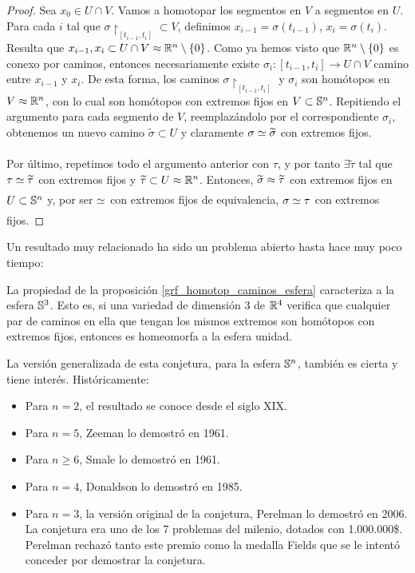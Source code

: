 \begin{prop}
\begin{proof}
		Sea $x_0\in U\cap V$. Vamos a homotopar los segmentos en $V$ a segmentos en $U$. Para cada $i$ tal que $\sigma\restriction_{[t_{i-1},t_i]}\subset V$, definimos $x_{i-1} = \sigma(t_{i-1})$, $x_i=\sigma(t_i)$. Resulta que $x_{i-1},x_i\subset U\cap V\approx \mathbb{R}^n\setminus\{0\}$. Como ya hemos visto que $\mathbb{R}^n\setminus \{0\}$ es conexo por caminos, entonces necesariamente existe $\sigma_i:[t_{i-1},t_i]\to U\cap V$ camino entre $x_{i-1}$ y $x_i$. De esta forma, los caminos $\sigma\restriction_{[t_{i-1},t_i]}$ y $\sigma_i$ son homótopos en $V\approx\mathbb{R}^n$, con lo cual son homótopos con extremos fijos en $V\subset\mathbb{S}^n$. Repitiendo el argumento para cada segmento de $V$, reemplazándolo por el correspondiente $\sigma_i$, obtenemos un nuevo camino $\widetilde{\sigma}\subset U$ y claramente $\sigma\underset{}{\simeq}\widetilde{\sigma}$ con extremos fijos.
		
		Por último, repetimos todo el argumento anterior con $\tau$, y por tanto $\exists \widetilde{\tau}$ tal que $\tau\underset{}{\simeq}\widetilde{\tau}$ con extremos fijos y $\widetilde{\tau}\subset U\approx\mathbb{R}^n$. Entonces, $\widetilde{\sigma}\approx\widetilde{\tau}$ con extremos fijos en $U\subset\mathbb{S}^n$ y, por ser $\underset{}{\simeq}$ con extremos fijos de equivalencia, $\sigma\underset{}{\simeq}\tau$ con extremos fijos.
	\end{proof}
\end{prop}

Un resultado muy relacionado ha sido un problema abierto hasta hace muy poco tiempo:

\begin{conjet}[Poincaré]
	La propiedad de la proposición \ref{grf_homotop_caminos_esfera} caracteriza a la esfera $\mathbb{S}^3$. Esto es, si una variedad de dimensión 3 de $\mathbb{R}^4$ verifica que cualquier par de caminos en ella que tengan los mismos extremos son homótopos con extremos fijos, entonces es homeomorfa a la esfera unidad.
\end{conjet}

La versión generalizada de esta conjetura, para la esfera $\mathbb{S}^n$, también es cierta y tiene interés. Históricamente:
\begin{itemize}
	\item Para $n=2$, el resultado se conoce desde el siglo XIX.
	\item Para $n=5$, Zeeman lo demostró en 1961.
	\item Para $n\geq 6$, Smale lo demostró en 1961.
	\item Para $n=4$, Donaldson lo demostró en 1985.
	\item Para $n=3$, la versión original de la conjetura, Perelman lo demostró en 2006. La conjetura era uno de los 7 problemas del milenio, dotados con 1.000.000\$. Perelman rechazó tanto este premio como la medalla Fields que se le intentó conceder por demostrar la conjetura.
\end{itemize}

